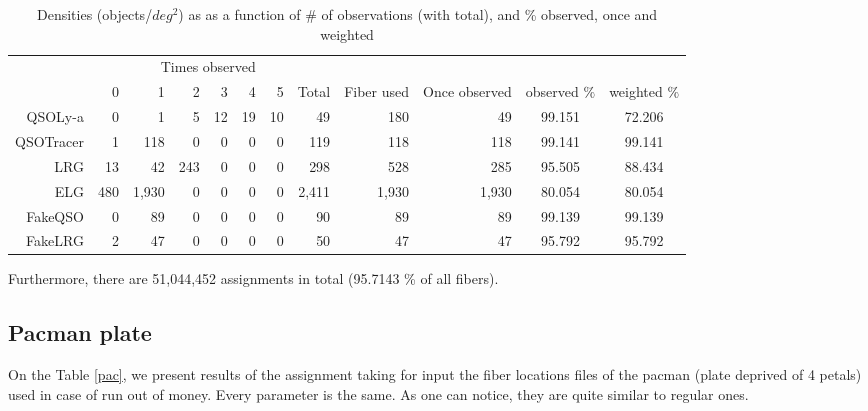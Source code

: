 \documentclass{article}
\def\sqd{$deg^{2}$}
\begin{document}
\begin{table}[H]\begin{center}
\begin{tabular}{rrrrrrrrrrcc}
\hline
\multicolumn{6}{r}{Times observed} \\
	~ &           0 &     1 &  2 & 3 & 4 & 5 &  Total & Fiber used & Once observed & observed $\%$ & weighted $\%$ \\ \hline
    QSOLy-a   &     0 &     1 &   5 & 12 & 19 & 10 &    49 &   180 &    49 & 99.151 & 72.206 \\ 
  QSOTracer   &     1 &   118 &   0 &  0 &  0 &  0 &   119 &   118 &   118 & 99.141 & 99.141 \\ 
        LRG   &    13 &    42 & 243 &  0 &  0 &  0 &   298 &   528 &   285 & 95.505 & 88.434 \\ 
        ELG   &   480 & 1,930 &   0 &  0 &  0 &  0 & 2,411 & 1,930 & 1,930 & 80.054 & 80.054 \\ 
    FakeQSO   &     0 &    89 &   0 &  0 &  0 &  0 &    90 &    89 &    89 & 99.139 & 99.139 \\ 
    FakeLRG   &     2 &    47 &   0 &  0 &  0 &  0 &    50 &    47 &    47 & 95.792 & 95.792 \\ 
\hline
\end{tabular}
\caption{Densities (objects/\sqd) as as a function of \# of observations (with total), and \% observed, once and weighted}\label{res}
\end{center}\end{table}

Furthermore, there are 51,044,452 assignments in total (95.7143 \% of all fibers).

\subsection{Pacman plate}
On the Table \ref{pac}, we present results of the assignment taking for input the fiber locations files of the pacman (plate deprived of 4 petals) used in case of run out of money. Every parameter is the same. As one can notice, they are quite similar to regular ones.
\end{document}
